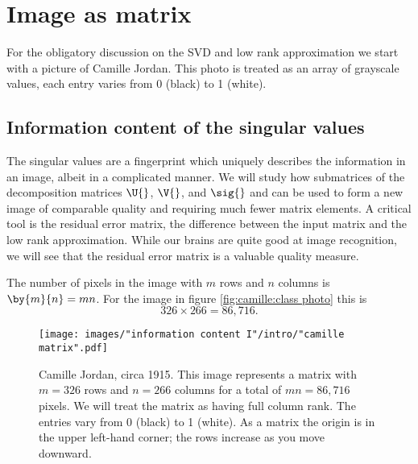 \break
\clearpage
\section[Image as matrix]{Image as matrix}

For the obligatory discussion on the SVD and low rank approximation we start with a picture of Camille Jordan. This photo is treated as an array of grayscale values, each entry varies from 0 (black) to 1 (white).


\subsection[Information content of the singular values]{Information content of the singular values}

The singular values are a fingerprint which uniquely describes the information in an image, albeit in a complicated manner.
 We will study how submatrices of the decomposition matrices $\U{}$, $\V{}$, and $\sig{}$ and can be used to form a new image of comparable quality and requiring much fewer matrix elements. A critical tool is the residual error matrix, the difference between the input matrix and the low rank approximation. While our brains are quite good at image recognition, we will see that the residual error matrix is a valuable quality measure.

The number of pixels in the image with $m$ rows and $n$ columns is $\by{m}{n} = mn$. For the image in figure \eqref{fig:camille:class photo} this is
\begin{equation*}
  326 \times 266 = 86,716.
\end{equation*}

\begin{figure}[htbp] %
   \centering
   \texttt{[image: images/"information content I"/intro/"camille matrix".pdf]} 
   \caption[Camille Jordan, circa 1915]{Camille Jordan, circa 1915. This image represents a matrix with $m = 326$ rows and $n = 266$ columns for a total of $mn=86,716$ pixels. We will treat the matrix as having full column rank. The entries vary from 0 (black) to 1 (white). As a matrix the origin is in the upper left-hand corner; the rows increase as you move downward.}
   \label{fig:camille:class photo}
\end{figure}


